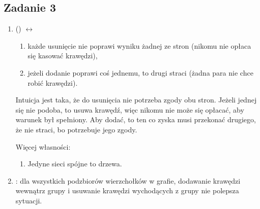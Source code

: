 \subsection{Zadanie 3}
\begin{enumerate}
  \item
     () $\leftrightarrow$
    \begin{enumerate}
      \item
        każde usunięcie nie poprawi wyniku żadnej ze stron (nikomu nie opłaca się kasować krawędzi),
      \item
        jeżeli dodanie poprawi coś jednemu, to drugi straci
         (żadna para nie chce robić krawędzi).
    \end{enumerate}

     Intuicja jest taka, że do usunięcia nie potrzeba zgody obu stron. Jeżeli
     jednej się nie podoba, to usuwa krawędź, więc nikomu nie może się opłacać,
     aby warunek był spełniony. Aby dodać, to ten co zyska musi przekonać
     drugiego, że nie straci, bo potrzebuje jego zgody.

     Więcej własności:
    \begin{enumerate}
      \item
        Jedyne  sieci spójne to drzewa.
    \end{enumerate}

   \item
     : dla wszystkich podzbiorów wierzchołków w
        grafie, dodawanie krawędzi wewnątrz grupy i usuwanie krawędzi
        wychodących z grupy nie polepsza sytuacji.
\end{enumerate}

